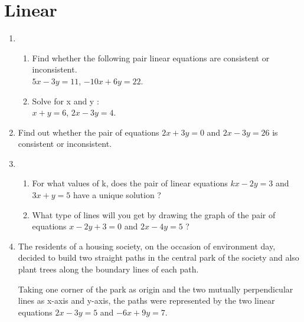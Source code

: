\documentclass{article}
\begin{document}
\section*{\center Linear}
\begin{enumerate}
\item 
\begin{enumerate}
    \item Find whether the following pair linear equations are consistent or 
inconsistent.\\
         $5x-3y=11$, $-10x+6y=22$.


    \item Solve for x and y : \\
         $x+y=6$, $2x-3y=4$.
 \end{enumerate}
 \item Find out whether the pair of equations $2x+3y=0$ and $2x-3y=26$ is consistent or inconsistent.
\item 
\begin{enumerate}
    \item For what values of k, does the pair of linear equations $kx-2y=3$ and $3x+y=5$ have a unique solution ?
    \item What type of lines will you get by drawing the graph of the pair of equations $x-2y+3=0$ and $2x-4y=5$ ?
\end{enumerate}
\item The residents of a housing society, on the occasion of environment day, decided to build two straight paths in the central park of the society and also plant trees along the boundary lines of each path.

Taking one corner of the park as origin and the two mutually perpendicular lines as x-axis and y-axis, the paths were represented by the two linear equations $2x-3y=5$ and $-6x+9y=7$.


\end{enumerate}
\end{document}
